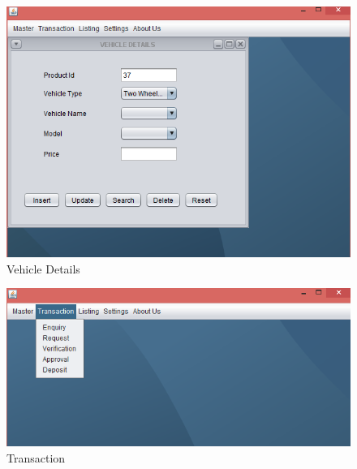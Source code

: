 \begin{figure}[ht]
\begin{center}
\includegraphics[scale=0.5]{images/image19.png}
\end{center}
\caption{Vehicle Details}
\label{Vehicle Details}
\end{figure}

\begin{figure}[ht]
\begin{center}
\includegraphics[scale=0.5]{images/image20.png}
\end{center}
\caption{Transaction}
\label{Transaction}
\end{figure}


